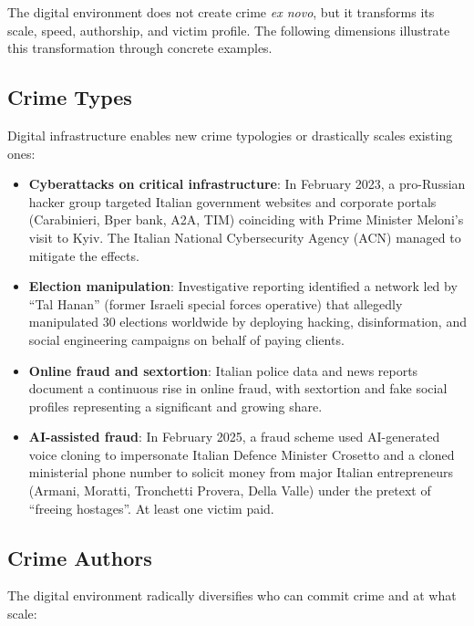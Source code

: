 \documentclass[11pt,a4paper,openany]{report}
\theoremstyle{definition}
\theoremstyle{plain}
\theoremstyle{remark}
\begin{document}
The digital environment does not create crime \textit{ex novo}, but it transforms its scale, speed, authorship, and victim profile. The following dimensions illustrate this transformation through concrete examples.

\subsection{Crime Types}

Digital infrastructure enables new crime typologies or drastically scales existing ones:

\begin{itemize}
    \item \textbf{Cyberattacks on critical infrastructure}: In February 2023, a pro-Russian hacker group targeted Italian government websites and corporate portals (Carabinieri, Bper bank, A2A, TIM) coinciding with Prime Minister Meloni's visit to Kyiv. The Italian National Cybersecurity Agency (ACN) managed to mitigate the effects.
    \item \textbf{Election manipulation}: Investigative reporting identified a network led by ``Tal Hanan'' (former Israeli special forces operative) that allegedly manipulated 30 elections worldwide by deploying hacking, disinformation, and social engineering campaigns on behalf of paying clients.
    \item \textbf{Online fraud and sextortion}: Italian police data and news reports document a continuous rise in online fraud, with sextortion and fake social profiles representing a significant and growing share.
    \item \textbf{AI-assisted fraud}: In February 2025, a fraud scheme used AI-generated voice cloning to impersonate Italian Defence Minister Crosetto and a cloned ministerial phone number to solicit money from major Italian entrepreneurs (Armani, Moratti, Tronchetti Provera, Della Valle) under the pretext of ``freeing hostages''. At least one victim paid.
\end{itemize}

\subsection{Crime Authors}

The digital environment radically diversifies who can commit crime and at what scale:
\end{document}
